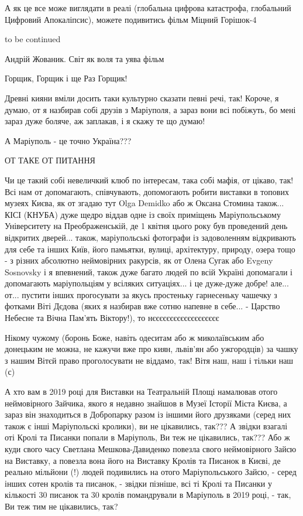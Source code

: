 А як це все може виглядати в реалі (глобальна цифрова катастрофа, глобальний
Цифровий Апокаліпсис), можете подивитись фільм Міцний Горішок-4 

to be continued

Андрій Жованик. Світ як воля та уява фільм


Горщик, Горщик і ще Раз Горщик!

Древні кияни вміли досить таки культурно сказати певні речі, так! Короче, я
думаю, от я назбирав собі друзів з Маріуполя, а зараз вони всі побіжуть, бо
мені зараз дуже боляче, аж заплакав, і я скажу те що думаю!

А Маріуполь - це точно Україна???

ОТ ТАКЕ ОТ ПИТАННЯ

Чи це такий собі невеличкий клюб по інтересам, така собі мафія, от цікаво, так!
Всі нам от допомагають, співчувають, допомогають робити виставки в топових
музеях Києва, як от згадаю тут Olga Demidko або ж Оксана Стомина також... КІСІ
(КНУБА) дуже щедро віддав одне із своїх приміщень Маріупольському Університету
на Преображенській, де 1 квітня цього року був проведений день відкритих
дверей... також, маріупольські фотографи із задоволенням відкривають для себе
та інших Київ, його памьятки, вулиці, архітектуру, природу, озера тощо - з
різних абсолютно неймовірних ракурсів, як от Олена Сугак або Evgeny  Sosnovsky
і я впевнений, також дуже багато людей по всій Україні допомагали і допомагають
маріупольціям у всіляких ситуаціях...  і це дуже-дуже добре! але... от...
пустити інших прогосувати за якусь простеньку гарнесеньку чашечку з фотками
Віті Дєдова (яких я назбирав вже сотню напевне в себе... - Царство Небесне та
Вічна Пам'ять Віктору!), то нєєєєєєєєєєєєєєєєєєє

Нікому чужому (боронь Боже, навіть одеситам або ж миколаївським або донецьким
не можна, не кажучи вже про киян, львів'ян або ужгородців) за чашку з нашим
Вітєй право проголосувати не віддамо, так! Вітя наш, наш і тільки наш (с)

А хто вам в 2019 році для Виставки на Театральній Площі намалював отого
неймовірного Зайчика, якого я недавно знайшов в Музеї Історії Міста Києва, а
зараз він знаходиться в Добропарку разом із іншими його друзяками (серед них
також є інші Маріупольскі кролики), ви не цікавились, так??? А звідки взагалі
оті Кролі та Писанки попали в Маріуполь, Ви теж не цікавились, так??? Або ж
куди свого часу Светлана Мешкова-Давиденко повезла свого неймовірного Зайсю на
Виставку, а повезла вона його на Виставку Кролів та Писанок в Києві, де реально
мільйони (!) людей подивились на отого Маріупольського Зайсю, - серед інших
сотен кролів та писанок, - звідки пізніше, всі ті Кролі та Писанки у кількості
30 писанок та 30 кролів помандрували в Маріуполь в 2019 році, - так, Ви теж тим
не цікавились, так? 

